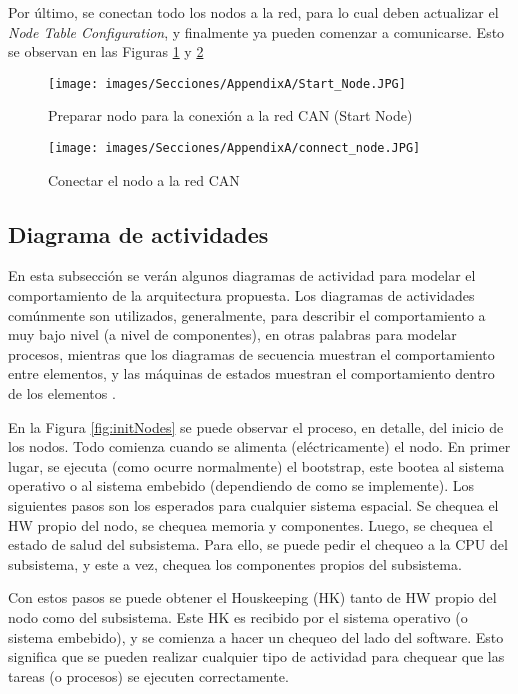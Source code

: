 Por último, se conectan todo los nodos a la red, para lo cual deben
actualizar el \textit{Node Table Configuration}, y finalmente ya
pueden comenzar a comunicarse. Esto se observan en las Figuras
\ref{fig:StartNodeC52} y \ref{fig:ConnectNodeC5}

\begin{figure}[h!]
 \centering
 \texttt{[image: images/Secciones/AppendixA/Start\_Node.JPG]}
  \caption{Preparar nodo para la conexión a la red CAN (Start Node)}
  \label{fig:StartNodeC52}
\end{figure}

\begin{figure}[h!]
 \centering
 \texttt{[image: images/Secciones/AppendixA/connect\_node.JPG]}
  \caption{Conectar el nodo a la red CAN}
  \label{fig:ConnectNodeC5}
\end{figure}

\subsection{Diagrama de actividades}
En esta subsección se verán algunos diagramas de actividad para modelar
el comportamiento de la arquitectura propuesta. Los diagramas de actividades
comúnmente son utilizados, generalmente, para describir el comportamiento
a muy bajo nivel (a nivel de componentes), en otras palabras para modelar
procesos, mientras que los diagramas de secuencia muestran el comportamiento
entre elementos, y las máquinas de estados  muestran el comportamiento
dentro de los elementos \citep{HoltPery}.

En la Figura \ref{fig:initNodes} se puede observar el proceso, en detalle,
del inicio de los nodos. Todo comienza cuando se alimenta (eléctricamente)
el nodo. En primer lugar, se ejecuta (como ocurre normalmente) el bootstrap,
este bootea al sistema operativo o al sistema embebido (dependiendo de como
se implemente). Los siguientes pasos son los esperados para cualquier sistema
espacial. Se chequea el \ac{HW} propio del nodo, se chequea memoria y componentes.
Luego, se chequea el estado de salud del subsistema. Para ello, se puede pedir
el chequeo a la CPU del subsistema, y este a vez, chequea los componentes
propios del subsistema.

Con estos pasos se puede obtener el Houskeeping (HK) tanto de \ac{HW} propio del nodo
como del subsistema. Este HK es recibido por el sistema operativo
(o sistema embebido), y se comienza a hacer un chequeo del lado del
software. Esto significa que se pueden realizar cualquier tipo de actividad
para chequear que las tareas (o procesos) se ejecuten correctamente.

